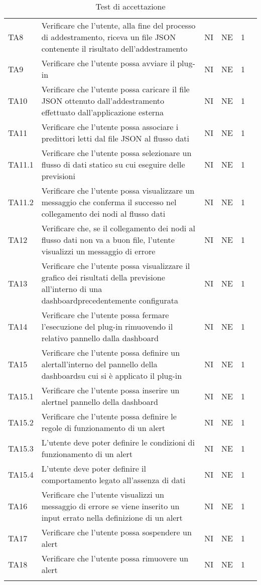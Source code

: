 \begin{longtable} {
	>{}p{12mm}
	>{}p{79.5mm}
	>{}p{9mm}
	>{}p{8mm}
	>{}p{14mm}
	>{}p{0mm}}
	TA8 & Verificare che l'utente, alla fine del processo di addestramento, riceva un file JSON contenente il risultato dell'addestramento & NI & NE & 1 & \TBstrut \\ [2mm]
	TA9	& Verificare che l'utente possa avviare il plug-in & NI & NE  & 1 & \TBstrut \\ [2mm]
	TA10 & Verificare che l'utente possa caricare il file JSON ottenuto dall'addestramento effettuato dall'applicazione esterna & NI & NE  & 1 & \TBstrut \\ [2mm]
	TA11 & Verificare che l'utente possa associare i predittori letti dal file JSON al flusso dati & NI & NE  & 1 & \TBstrut \\ [2mm]
	TA11.1 & Verificare che l'utente possa selezionare un flusso di dati statico su cui eseguire delle previsioni & NI & NE  & 1 & \TBstrut \\ [2mm]
	TA11.2 & Verificare che l'utente possa visualizzare un messaggio che conferma il successo nel collegamento dei nodi al flusso dati & NI & NE  & 1 & \TBstrut \\ [2mm]
	TA12 & Verificare che, se il collegamento dei nodi al flusso dati non va a buon file, l'utente visualizzi un messaggio di errore & NI & NE  & 1 & \TBstrut \\ [2mm]
	TA13 & Verificare che l'utente possa visualizzare il grafico dei risultati della previsione all'interno di una dashboard\glosp precedentemente configurata & NI & NE  & 1 & \TBstrut \\ [2mm]
	TA14 & Verificare che l'utente possa fermare l'esecuzione del plug-in rimuovendo il relativo pannello dalla dashboard\glo & NI & NE  & 1 & \TBstrut \\ [2mm]
	TA15 & Verificare che l'utente possa definire un alert\glosp all'interno del pannello della dashboard\glosp su cui si è applicato il plug-in & NI & NE  & 1 & \TBstrut \\ [2mm]
	TA15.1 & Verificare che l'utente possa inserire un alert\glosp nel pannello della dashboard\glo & NI & NE  & 1 & \TBstrut \\ [2mm]
	TA15.2 & Verificare che l'utente possa definire le regole di funzionamento di un alert\glo & NI & NE  & 1 & \TBstrut \\ [2mm]
	TA15.3 & L'utente deve poter definire le condizioni di funzionamento di un alert\glo & NI & NE  & 1 & \TBstrut \\ [2mm]
	TA15.4 & L'utente deve poter definire il comportamento legato all'assenza di dati  & NI & NE  & 1 & \TBstrut \\ [2mm]
	TA16 & Verificare che l'utente visualizzi un messaggio di errore se viene inserito un input errato nella definizione di un alert\glo & NI & NE  & 1 & \TBstrut \\ [2mm]
	TA17 & Verificare che l'utente possa sospendere un alert\glo & NI & NE  & 1 & \TBstrut \\ [2mm]
	TA18 & Verificare che l'utente possa rimuovere un alert\glo & NI & NE  & 1 & \TBstrut \\ [2mm]
	\rowcolor{white}
	\caption{Test di accettazione}
\end{longtable}

